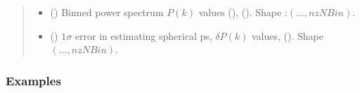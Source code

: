 \documentclass[a4paper,11pt,oneside,english,openany]{sphinxmanual}
\begin{document}
\begin{fulllineitems}
\begin{quote}
\begin{description}
\begin{itemize}
\item {} 
\sphinxAtStartPar
{} () \textendash{} Binned power spectrum \(P(k)\) values (), (). Shape :\((\dots,{nzN\!Bin})\).

\item {} 
\sphinxAtStartPar
{} () \textendash{} \(1\sigma\) error in estimating spherical ps, \(\delta P(k)\) values, (). Shape \((\dots,{nzN\!Bin})\).

\end{itemize}


\end{description}\end{quote}
\subsubsection*{Examples}


\end{fulllineitems}
\end{document}

